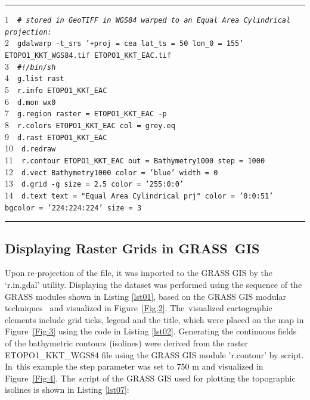 \documentclass[technologies,article,accept,pdftex,moreauthors]{Definitions/mdpi}
\begin{document}
\begin{listing}[H]
\caption{GRASS GIS %
 script for plotting map in Equal-Area Cylindrical projection.}\label{lst06}
\rule{\columnwidth}{1pt}
\raggedright
1~~\texttt{\emph{\# stored in GeoTIFF in WGS84 warped to an Equal Area Cylindrical projection:\\}}
2~~\texttt{gdalwarp -t\_srs '+proj = cea lat\_ts = 50 lon\_0 = 155' ETOPO1\_KKT\_WGS84.tif ETOPO1\_KKT\_EAC.tif\\}
3~~\texttt{\emph{\#!/bin/sh\\}}
4~~\texttt{g.list rast\\}
5~~\texttt{r.info ETOPO1\_KKT\_EAC\\}
6~~\texttt{d.mon wx0\\}
7~~\texttt{g.region raster = ETOPO1\_KKT\_EAC -p\\}
8~~\texttt{r.colors ETOPO1\_KKT\_EAC col = grey.eq\\}
9~~\texttt{d.rast ETOPO1\_KKT\_EAC\\}
10~~\texttt{d.redraw\\}
11~~\texttt{r.contour ETOPO1\_KKT\_EAC out = Bathymetry1000 step = 1000\\}
12~~\texttt{d.vect Bathymetry1000 color = 'blue' width = 0\\}
13~~\texttt{d.grid -g size = 2.5 color = '255:0:0'\\}
14~~\texttt{d.text text = "Equal Area Cylindrical prj" color = '0:0:51' bgcolor = '224:224:224' size = 3\\}
\rule{\columnwidth}{1pt}
\end{listing}

\subsection{Displaying Raster Grids in GRASS~GIS}

Upon re-projection of the file, it was imported to the GRASS GIS by the ‘r.in.gdal’ utility. Displaying the dataset was performed using the sequence of the GRASS modules shown in Listing \ref{lst01}, based on the GRASS GIS modular techniques~\cite{Brown} and visualized in Figure~\ref{Fig:2}. The~visualized cartographic elements include grid ticks, legend and the title, which were placed on the map in Figure~\ref{Fig:3} using the code in Listing \ref{lst02}. Generating the continuous fields of the bathymetric contours (isolines) were derived from the raster ETOPO1\_KKT\_WGS84 file using the GRASS GIS module 'r.contour' by script. In~this example the step parameter was set to 750 m and visualized in Figure~\ref{Fig:4}. The~script of the GRASS GIS used for plotting the topographic isolines is shown in Listing \ref{lst07}:
\end{document}
